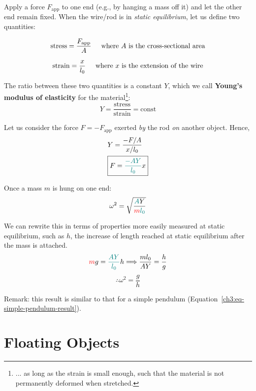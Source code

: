 Apply a force $F_\text{app}$ to one end (e.g., by hanging a mass off it) and let the other end remain fixed. When the wire/rod is in \textit{static equilibrium}, let us define two quantities:

\[ \text{stress} = \frac{F_\text{app}}{A} \hspace{0.5cm}\text{where }\text{$A$ is the cross-sectional area} \]

\[  \text{strain} = \frac{x}{l_0} \hspace{0.5cm}\text{where }\text{$x$ is the extension of the wire}  \]

The ratio between these two quantities is a constant $Y$, which we call \textbf{Young's modulus of elasticity} for the material\footnote{... as long as the strain is small enough, such that the material is not permanently deformed when stretched.}:
\begin{equation}
	\boxed{ Y = \frac{\text{stress}}{\text{strain}} = \text{const}} \label{ch3:eq-Youngs-Modulus}
\end{equation}

Let us consider the force $F = -F_\text{app}$ exerted \emph{by} the rod \emph{on} another object. Hence,
\begin{align}
	& Y = \frac{-F/A}{x/l_0} \notag \\
	& \boxed{F = \textcolor{teal}{\frac{-AY}{l_0}} x } \label{ch3:eq-Youngs-F}
\end{align}


Once a mass $m$ is hung on one end:
\[ \omega^2 = \sqrt{\frac{\textcolor{teal}{A}Y}{\textcolor{red}{m} \textcolor{teal}{l_0}}} \]

We can rewrite this in terms of properties more easily measured at static equilibrium, such as $h$, the increase of length reached at static equilibrium after the mass is attached.
\[ \textcolor{red}{m}g=\textcolor{teal}{\frac{AY}{l_0}} h \Longrightarrow \frac{ml_0}{AY}=\frac{h}{g} \]
\begin{equation}
\therefore \omega^2 = \frac{g}{h}  \label{ch3:eq-elastic-wire-result}
\end{equation} 

Remark: this result is similar to that for a simple pendulum (Equation~\ref{ch3:eq-simple-pendulum-result}).

\section{Floating Objects} \label{ch3:sec-floating}

